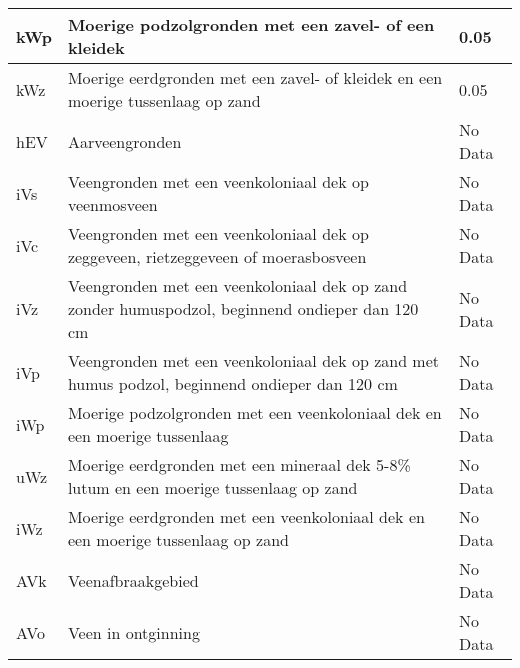 \documentclass[a4paper,12pt]{scrbook}
\begin{document}
\begin{appendices}
\begin{center}
\begin{longtable}{|l| p{11cm} | l |}
kWp & Moerige podzolgronden met een zavel- of een kleidek  & 0.05 \\ \hline
kWz & Moerige eerdgronden met een zavel- of kleidek en een moerige tussenlaag op zand  & 0.05 \\ \hline
hEV & Aarveengronden  & \multicolumn{1}{l|}{No Data} \\ \hline
iVs & Veengronden met een veenkoloniaal dek op veenmosveen & \multicolumn{1}{l|}{No Data} \\ \hline
iVc & Veengronden met een veenkoloniaal dek op zeggeveen, rietzeggeveen of moerasbosveen  & \multicolumn{1}{l|}{No Data} \\ \hline
iVz & Veengronden met een veenkoloniaal dek op zand zonder humuspodzol, beginnend ondieper dan 120 cm  & \multicolumn{1}{l|}{No Data} \\ \hline
iVp & Veengronden met een veenkoloniaal dek op zand met humus podzol, beginnend ondieper dan 120 cm  & \multicolumn{1}{l|}{No Data} \\ \hline
iWp & Moerige podzolgronden met een veenkoloniaal dek en een moerige tussenlaag  & \multicolumn{1}{l|}{No Data} \\ \hline
uWz & Moerige eerdgronden met een mineraal dek 5-8\% lutum en een moerige tussenlaag op zand  & \multicolumn{1}{l|}{No Data} \\ \hline
iWz & Moerige eerdgronden met een veenkoloniaal dek en een moerige tussenlaag op zand  & \multicolumn{1}{l|}{No Data} \\ \hline
AVk & Veenafbraakgebied & \multicolumn{1}{l|}{No Data} \\ \hline
AVo & Veen in ontginning & \multicolumn{1}{l|}{No Data} \\ \hline
\end{longtable}
\end{center}


\end{appendices}


\end{document}
